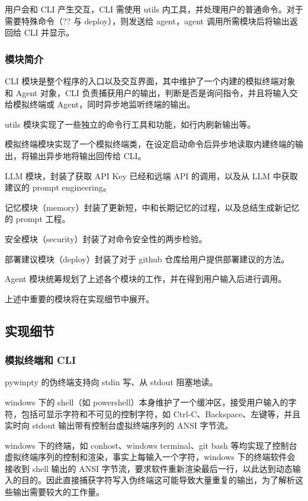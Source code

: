 \documentclass{article}
\theoremstyle{plain}
\theoremstyle{definition}
\theoremstyle{remark}
\begin{document}
用户会和 CLI 产生交互，CLI 需使用 utils 内工具，并处理用户的普通命令。对于需要特殊命令（?? 与 deploy），则发送给 agent，agent 调用所需模块后将输出返回给 CLI 并显示。

\subsubsection{模块简介}

CLI 模块是整个程序的入口以及交互界面，其中维护了一个内建的模拟终端对象和 Agent 对象，CLI 负责捕获用户的输出，判断是否是询问指令，并且将输入交给模拟终端或 Agent，同时异步地监听终端的输出。

utils 模块实现了一些独立的命令行工具和功能，如行内刷新输出等。

模拟终端模块实现了一个模拟终端类，在设定启动命令后异步地读取内建终端的输出，将输出异步地将输出回传给 CLI。

LLM 模块，封装了获取 API Key 已经和远端 API 的调用，以及从 LLM 中获取建议的 prompt engineering。

记忆模块（memory）封装了更新短，中和长期记忆的过程，以及总结生成新记忆的 prompt 工程。

安全模块（security）封装了对命令安全性的两步检验。

部署建议模块（deploy）封装了对于 github 仓库给用户提供部署建议的方法。

Agent 模块统筹规划了上述各个模块的工作，并在得到用户输入后进行调用。

上述中重要的模块将在实现细节中展开。

\subsection{实现细节}

\subsubsection{模拟终端和 CLI}

pywinpty 的伪终端支持向 stdin 写、从 stdout 阻塞地读。

windows 下的 shell（如 powershell）本身维护了一个缓冲区，接受用户输入的字符，包括可显示字符和不可见的控制字符，如 Ctrl-C、Backspace、左键等，并且实时向 stdout 输出带有控制台虚拟终端序列的 ANSI 字节流。

windows 下的终端，如 conhost、windows terminal、git bash 等均实现了控制台虚拟终端序列的控制和渲染，事实上每输入一个字符，windows 下的终端软件会接收到 shell 输出的 ANSI 字节流，要求软件重新渲染最后一行，以此达到动态输入的目的。因此直接捕获字符写入伪终端这可能导致大量重复的输出，为了解析这些输出需要较大的工作量。
\end{document}
